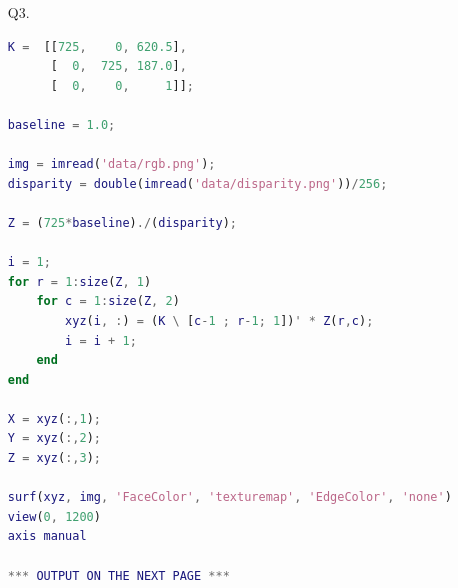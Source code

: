 \documentclass{csc_assignment4}
\begin{document}
\begin{description}
\begin{enumerate}[label=(\alph*)]
\item[Q3.]
\begin{lstlisting}[language=MATLAB]
K =  [[725,    0, 620.5],
      [  0,  725, 187.0],
      [  0,    0,     1]];
  
baseline = 1.0;

img = imread('data/rgb.png');
disparity = double(imread('data/disparity.png'))/256;

Z = (725*baseline)./(disparity);

i = 1;
for r = 1:size(Z, 1)
    for c = 1:size(Z, 2)
        xyz(i, :) = (K \ [c-1 ; r-1; 1])' * Z(r,c);
        i = i + 1;
    end
end

X = xyz(:,1);
Y = xyz(:,2);
Z = xyz(:,3);

surf(xyz, img, 'FaceColor', 'texturemap', 'EdgeColor', 'none')
view(0, 1200)
axis manual

*** OUTPUT ON THE NEXT PAGE ***
\end{lstlisting}


\end{enumerate}
\end{description}
\end{document}
